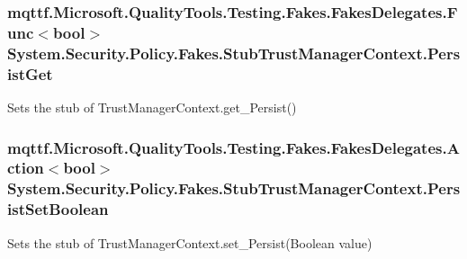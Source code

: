 \hypertarget{class_system_1_1_security_1_1_policy_1_1_fakes_1_1_stub_trust_manager_context_a95df8e44d6d8778cdb4ffd2a63a0372c}{
\subsubsection[{Persist\-Get}]{\setlength{\rightskip}{0pt plus 5cm}mqttf.\-Microsoft.\-Quality\-Tools.\-Testing.\-Fakes.\-Fakes\-Delegates.\-Func$<$bool$>$ System.\-Security.\-Policy.\-Fakes.\-Stub\-Trust\-Manager\-Context.\-Persist\-Get}}\label{class_system_1_1_security_1_1_policy_1_1_fakes_1_1_stub_trust_manager_context_a95df8e44d6d8778cdb4ffd2a63a0372c}


Sets the stub of Trust\-Manager\-Context.\-get\-\_\-\-Persist()

\hypertarget{class_system_1_1_security_1_1_policy_1_1_fakes_1_1_stub_trust_manager_context_a1d1f0ee70ba20b095421b065d820796c}{
\subsubsection[{Persist\-Set\-Boolean}]{\setlength{\rightskip}{0pt plus 5cm}mqttf.\-Microsoft.\-Quality\-Tools.\-Testing.\-Fakes.\-Fakes\-Delegates.\-Action$<$bool$>$ System.\-Security.\-Policy.\-Fakes.\-Stub\-Trust\-Manager\-Context.\-Persist\-Set\-Boolean}}\label{class_system_1_1_security_1_1_policy_1_1_fakes_1_1_stub_trust_manager_context_a1d1f0ee70ba20b095421b065d820796c}


Sets the stub of Trust\-Manager\-Context.\-set\-\_\-\-Persist(\-Boolean value)


